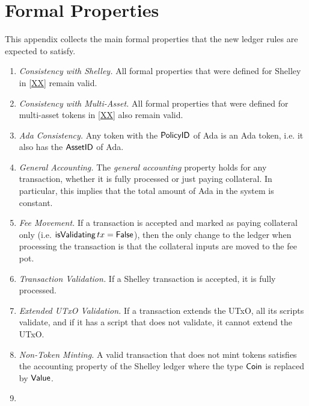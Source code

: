 \section{Formal Properties}
\label{sec:properties}

This appendix collects the main formal properties that the new ledger rules are expected to satisfy.

\begin{enumerate}[label=P{\arabic*}:\ ]
\item
  \emph{Consistency with Shelley.}
  All formal properties that were defined for Shelley in \ref{XX} remain valid.
\item
  \emph{Consistency with Multi-Asset.}
  All formal properties that were defined for multi-asset tokens in \ref{XX} also remain valid.
\item
  \emph{Ada Consistency.}
  Any token with the $\mathsf{PolicyID}$ of Ada is an Ada token, i.e. it
  also has the $\mathsf{AssetID}$ of Ada.
\item
  \emph{General Accounting.}
  The \emph{general accounting} property holds for any transaction,
  whether it is fully processed or just paying collateral. In particular,
  this implies that the total amount of Ada in the system is constant.
\item
  \emph{Fee Movement.}
  If a transaction is accepted and marked as paying collateral only
  (i.e. $\mathsf{isValidating}\, tx = \mathsf{False}$), then the only change to the ledger
  when processing the transaction is that the collateral inputs
  are moved to the fee pot.
\item
  \emph{Transaction Validation.}
  If a Shelley transaction is accepted, it is fully processed.
\item
  \emph{Extended UTxO Validation.}
  If a transaction extends the UTxO, all its scripts validate, and
  if it has a script that does not validate, it cannot extend the
  UTxO.
\item
  \emph{Non-Token Minting.}
  A valid transaction that does not mint tokens satisfies the
  accounting property of the Shelley ledger where the type $\mathsf{Coin}$ is
  replaced by $\mathsf{Value}$.
\item

\end{enumerate}

